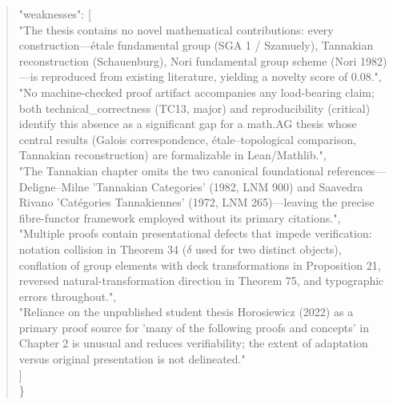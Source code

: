 \documentclass[11pt]{article}
\begin{document}
\begin{quote}
  "weaknesses": [\\
    "The thesis contains no novel mathematical contributions: every construction---étale fundamental group (SGA 1 / Szamuely), Tannakian reconstruction (Schauenburg), Nori fundamental group scheme (Nori 1982)---is reproduced from existing literature, yielding a novelty score of 0.08.",\\
    "No machine-checked proof artifact accompanies any load-bearing claim; both technical\_correctness (TC13, major) and reproducibility (critical) identify this absence as a significant gap for a math.AG thesis whose central results (Galois correspondence, étale--topological comparison, Tannakian reconstruction) are formalizable in Lean/Mathlib.",\\
    "The Tannakian chapter omits the two canonical foundational references---Deligne--Milne 'Tannakian Categories' (1982, LNM 900) and Saavedra Rivano 'Catégories Tannakiennes' (1972, LNM 265)---leaving the precise fibre-functor framework employed without its primary citations.",\\
    "Multiple proofs contain presentational defects that impede verification: notation collision in Theorem 34 (\ensuremath{\delta} used for two distinct objects), conflation of group elements with deck transformations in Proposition 21, reversed natural-transformation direction in Theorem 75, and typographic errors throughout.",\\
    "Reliance on the unpublished student thesis Horosiewicz (2022) as a primary proof source for 'many of the following proofs and concepts' in Chapter 2 is unusual and reduces verifiability; the extent of adaptation versus original presentation is not delineated."\\
  ]\\
\}\\
\end{quote}
\end{document}
